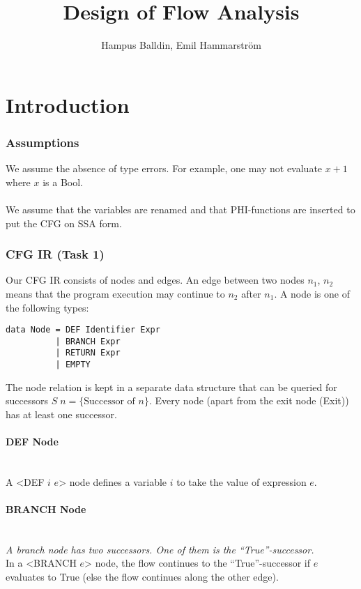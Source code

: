 \documentclass[a4paper]{article}
\title{Design of Flow Analysis}
\author{Hampus Balldin, Emil Hammarström
}
\newcommand{\NL}[0]{ \hfill\\\noindent }
\begin{document}
\thispagestyle{empty}


\maketitle                    %
{}
\newpage
\tableofcontents
{}
\newpage
\section{Introduction}
\subsubsection{Assumptions}
We assume the absence of type errors. For example, one may not evaluate $x + 1$ where $x$ is a Bool.\NL\NL
We assume that the variables are renamed and that PHI-functions are inserted to put the CFG on SSA form.

\subsubsection{CFG IR (Task 1)}
Our CFG IR consists of nodes and edges. An edge between two nodes $n_1$, $n_2$ means that the program execution may continue to $n_2$ after $n_1$. A node is one of the following types:

\begin{verbatim}
data Node = DEF Identifier Expr
		  | BRANCH Expr
	      | RETURN Expr
          | EMPTY
\end{verbatim}
\noindent
The node relation is kept in a separate data structure that can be queried for successors $S\;n = \{ \text{Successor of } n \}$. Every node (apart from the exit node (Exit)) has at least one successor. 

\paragraph{DEF Node}\NL
A <DEF $i$ $e$> node defines a variable $i$ to take the value of expression $e$. 

\paragraph{BRANCH Node}\NL
\textit{A branch node has two successors. One of them is the ``True''-successor.} \NL
In a <BRANCH $e$> node, the flow continues to the ``True''-successor if $e$ evaluates to True (else the flow continues along the other edge).
\end{document}

